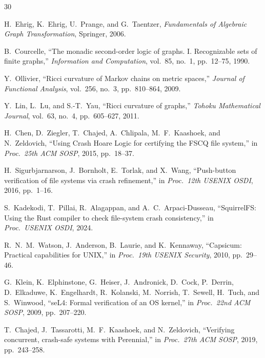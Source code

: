 \documentclass[11pt,a4paper]{article}
\theoremstyle{definition}
\theoremstyle{remark}
\begin{document}
\newpage
\begin{thebibliography}{30}

H.~Ehrig, K.~Ehrig, U.~Prange, and G.~Taentzer,
\emph{Fundamentals of Algebraic Graph Transformation},
Springer, 2006.

B.~Courcelle,
``The monadic second-order logic of graphs. I. Recognizable sets of
finite graphs,''
\emph{Information and Computation}, vol.~85, no.~1, pp.~12--75, 1990.

Y.~Ollivier,
``Ricci curvature of Markov chains on metric spaces,''
\emph{Journal of Functional Analysis}, vol.~256, no.~3,
pp.~810--864, 2009.

Y.~Lin, L.~Lu, and S.-T.~Yau,
``Ricci curvature of graphs,''
\emph{Tohoku Mathematical Journal}, vol.~63, no.~4,
pp.~605--627, 2011.

H.~Chen, D.~Ziegler, T.~Chajed, A.~Chlipala, M.~F.~Kaashoek,
and N.~Zeldovich,
``Using Crash Hoare Logic for certifying the FSCQ file system,''
in \emph{Proc.\ 25th ACM SOSP}, 2015, pp.~18--37.

H.~Sigurbjarnarson, J.~Bornholt, E.~Torlak, and X.~Wang,
``Push-button verification of file systems via crash refinement,''
in \emph{Proc.\ 12th USENIX OSDI}, 2016, pp.~1--16.

S.~Kadekodi, T.~Pillai, R.~Alagappan, and A.~C.~Arpaci-Dusseau,
``SquirrelFS: Using the Rust compiler to check file-system
crash consistency,''
in \emph{Proc.\ USENIX OSDI}, 2024.

R.~N.~M.~Watson, J.~Anderson, B.~Laurie, and K.~Kennaway,
``Capsicum: Practical capabilities for UNIX,''
in \emph{Proc.\ 19th USENIX Security}, 2010, pp.~29--46.

G.~Klein, K.~Elphinstone, G.~Heiser, J.~Andronick, D.~Cock,
P.~Derrin, D.~Elkaduwe, K.~Engelhardt, R.~Kolanski, M.~Norrish,
T.~Sewell, H.~Tuch, and S.~Winwood,
``seL4: Formal verification of an OS kernel,''
in \emph{Proc.\ 22nd ACM SOSP}, 2009, pp.~207--220.

T.~Chajed, J.~Tassarotti, M.~F.~Kaashoek, and N.~Zeldovich,
``Verifying concurrent, crash-safe systems with Perennial,''
in \emph{Proc.\ 27th ACM SOSP}, 2019, pp.~243--258.


\end{thebibliography}
\end{document}
